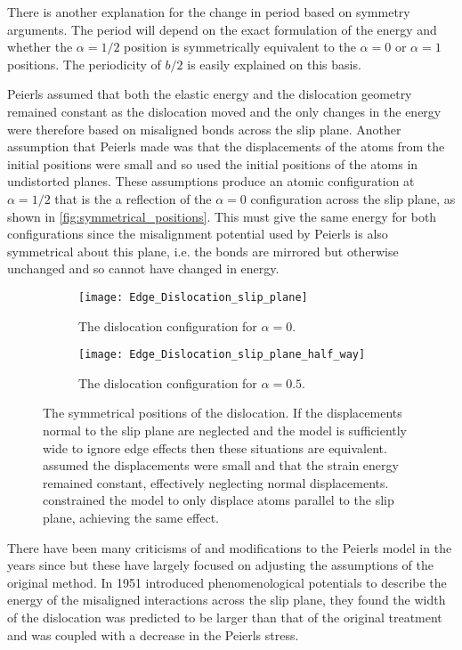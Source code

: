 There is another explanation for the change in period based on symmetry arguments. The period will depend on the exact formulation of the energy and whether the $\alpha=1/2$ position is symmetrically equivalent to the $\alpha = 0$ or $ \alpha = 1$ positions. The periodicity of $b/2$ is easily explained on this basis.

Peierls assumed that both the elastic energy and the dislocation geometry remained constant as the dislocation moved and the only changes in the energy were therefore based on misaligned bonds across the slip plane. Another assumption that Peierls made was that the displacements of the atoms from the initial positions were small and so used the initial positions of the atoms in undistorted planes. These assumptions produce an atomic configuration at $\alpha=1/2$ that is the a reflection  of the $\alpha=0$ configuration across the slip plane, as shown in \autoref{fig:symmetrical_positions}. This must give the same energy for both configurations since the misalignment potential used by Peierls is  also symmetrical about this plane, i.e. the bonds are mirrored but otherwise unchanged and so cannot have changed in energy.

\begin{figure}
\centering
\begin{subfigure}{0.5\textwidth}
\centering\texttt{[image: Edge\_Dislocation\_slip\_plane]}
\caption{The dislocation configuration for $\alpha=0$.}
\end{subfigure}


\begin{subfigure}{0.5\textwidth}
\centering\texttt{[image: Edge\_Dislocation\_slip\_plane\_half\_way]}
\caption{The dislocation configuration for $\alpha=0.5$.}
\end{subfigure}

\caption[The symmetrical positions of the dislocation.]{The symmetrical positions of the dislocation. If the displacements normal to the slip plane are neglected and the model is sufficiently wide to ignore edge effects then these situations are equivalent. \citet{Peierls1940} assumed the displacements were small and that the strain energy remained constant, effectively neglecting normal displacements. \citet{Clegg2006} constrained the model to only displace atoms parallel to the slip plane, achieving the same effect.\label{fig:symmetrical_positions}}
\end{figure}


There have been many criticisms of and modifications to the Peierls model in the years since but these have largely focused on adjusting the assumptions of the original method.
In 1951 \citet{Foreman1951} introduced phenomenological potentials to describe the energy of the misaligned interactions across the slip plane, they found the width of the dislocation was predicted to be larger than that of the original treatment and was coupled with a decrease in the Peierls stress.

